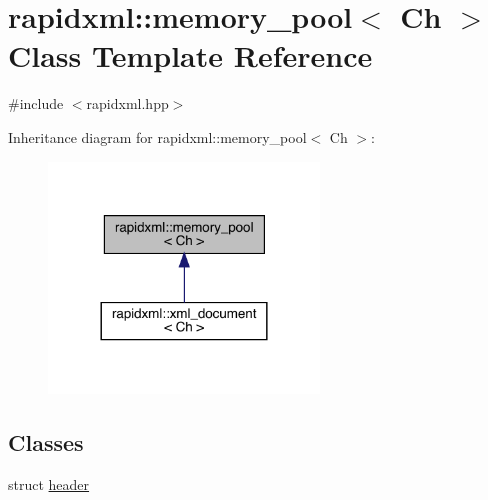 \hypertarget{classrapidxml_1_1memory__pool}{}\section{rapidxml\+::memory\+\_\+pool$<$ Ch $>$ Class Template Reference}
\label{classrapidxml_1_1memory__pool}


{\ttfamily \#include $<$rapidxml.\+hpp$>$}



Inheritance diagram for rapidxml\+::memory\+\_\+pool$<$ Ch $>$\+:\nopagebreak
\begin{figure}[H]
\begin{center}
\leavevmode
\includegraphics[width=204pt]{classrapidxml_1_1memory__pool__inherit__graph}
\end{center}
\end{figure}
\subsection*{Classes}
\begin{DoxyCompactItemize}
\item 
struct \mbox{\hyperlink{structrapidxml_1_1memory__pool_1_1header}{header}}
\end{DoxyCompactItemize}
